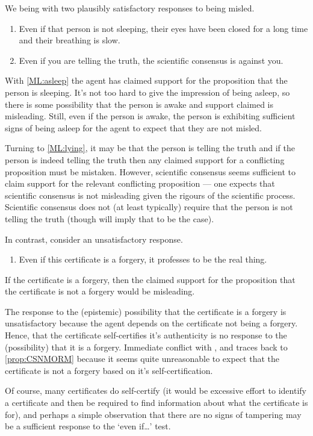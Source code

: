 \begin{note}

  We being with two plausibly satisfactory responses to being misled.

  \begin{enumerate}[label=(ML\arabic*), ref=(ML\arabic*), series=ML_counter]
  \item\label{ML:asleep} Even if that person is not sleeping, their eyes have been closed for a long time and their breathing is slow.
  \item\label{ML:lying} Even if you are telling the truth, the scientific consensus is against you.
  \end{enumerate}

  With \ref{ML:asleep} the agent has claimed support for the proposition that the person is sleeping.
  It's not too hard to give the impression of being asleep, so there is some possibility that the person is awake and support claimed is misleading.
  Still, even if the person is awake, the person is exhibiting sufficient signs of being asleep for the agent to expect that they are not misled.

  Turning to \ref{ML:lying}, it may be that the person is telling the truth and if the person is indeed telling the truth then any claimed support for a conflicting proposition must be mistaken.
  However, scientific consensus seems sufficient to claim support for the relevant conflicting proposition --- one expects that scientific consensus is not misleading given the rigours of the scientific process.
  Scientific consensus does not (at least typically) require that the person is not telling the truth (though will imply that to be the case).

  In contrast, consider an unsatisfactory response.

  \begin{enumerate}[label=(ML\arabic*), ref=(ML\arabic*), resume*=ML_counter]
  \item\label{ML:forgery} Even if this certificate is a forgery, it professes to be the real thing.
  \end{enumerate}
  If the certificate is a forgery, then the claimed support for the proposition that the certificate is not a forgery would be misleading.

  The response to the (epistemic) possibility that the certificate is a forgery is unsatisfactory because the agent depends on the certificate not being a forgery.
  Hence, that the certificate self-certifies it's authenticity is no response to the (possibility) that it is a forgery.
  Immediate conflict with \eiS{}, and traces back to \autoref{prop:CSNMORM} because it seems quite unreasonable to expect that the certificate is not a forgery based on it's self-certification.

  Of course, many certificates do self-certify (it would be excessive effort to identify a certificate and then be required to find information about what the certificate is for), and perhaps a simple observation that there are no signs of tampering may be a sufficient response to the `even if\dots' test.
\end{note}

